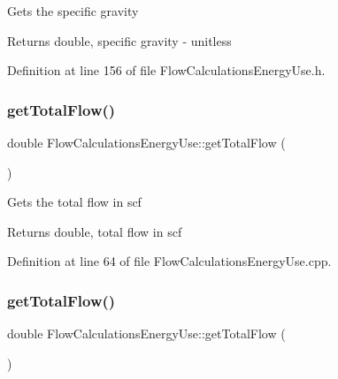 Gets the specific gravity

\begin{DoxyReturn}{Returns}
double, specific gravity -\/ unitless 
\end{DoxyReturn}


Definition at line 156 of file Flow\+Calculations\+Energy\+Use.\+h.

\mbox{\label{class_flow_calculations_energy_use_a154ce8f8307b443366b99719987dd725}} 
\subsubsection{\texorpdfstring{get\+Total\+Flow()}{getTotalFlow()}\hspace{0.1cm}{\footnotesize\ttfamily [1/3]}}
{\footnotesize\ttfamily double Flow\+Calculations\+Energy\+Use\+::get\+Total\+Flow (\begin{DoxyParamCaption}{ }\end{DoxyParamCaption})}

Gets the total flow in scf

\begin{DoxyReturn}{Returns}
double, total flow in scf 
\end{DoxyReturn}


Definition at line 64 of file Flow\+Calculations\+Energy\+Use.\+cpp.

\mbox{\label{class_flow_calculations_energy_use_a154ce8f8307b443366b99719987dd725}} 
\subsubsection{\texorpdfstring{get\+Total\+Flow()}{getTotalFlow()}\hspace{0.1cm}{\footnotesize\ttfamily [2/3]}}
{\footnotesize\ttfamily double Flow\+Calculations\+Energy\+Use\+::get\+Total\+Flow (\begin{DoxyParamCaption}{ }\end{DoxyParamCaption})}

